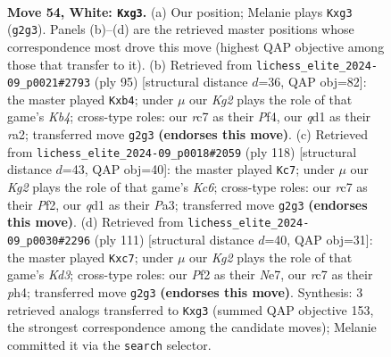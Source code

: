 \documentclass[11pt]{article}
\begin{document}
\clearpage

\begin{figure}[p]\centering
\begin{subfigure}{0.46\textwidth}\centering
\resizebox{\linewidth}{!}{%
\newchessgame
\chessboard[
  setfen={8/2r3pk/1P6/8/3pp3/6r1/5PK1/3q4 w - - 0 54},
  showmover=false,
  pgfstyle=straightmove, color=movearrow, markmove={g2-g3}
]}
\caption{}
\end{subfigure}\hfill
\begin{subfigure}{0.46\textwidth}\centering
\resizebox{\linewidth}{!}{%
\newchessgame
\chessboard[
  setfen={8/8/3p4/1kpP4/1R3p2/8/R5P1/2K5 b - - 0 48},
  showmover=false,
  pgfstyle=straightmove, color=movearrow, markmove={b5-b4}
]}
\caption{}
\end{subfigure}
\\[4pt]
\begin{subfigure}{0.46\textwidth}\centering
\resizebox{\linewidth}{!}{%
\newchessgame
\chessboard[
  setfen={7R/5k2/r1KP1p2/8/p6p/P7/5P2/8 w - - 7 60},
  showmover=false,
  pgfstyle=straightmove, color=movearrow, markmove={c6-c7}
]}
\caption{}
\end{subfigure}\hfill
\begin{subfigure}{0.46\textwidth}\centering
\resizebox{\linewidth}{!}{%
\newchessgame
\chessboard[
  setfen={8/2P1n3/3k2R1/7p/7P/6P1/6K1/8 b - - 0 56},
  showmover=false,
  pgfstyle=straightmove, color=movearrow, markmove={d6-c7}
]}
\caption{}
\end{subfigure}
\caption{\textbf{Move 54, White: \texttt{Kxg3}.} (a) Our position; Melanie plays \texttt{Kxg3} (\texttt{g2g3}). Panels (b)--(d) are the retrieved master positions whose correspondence most drove this move (highest QAP objective among those that transfer to it). (b) Retrieved from \texttt{lichess\_elite\_2024-09\_p0021\#2793} (ply 95) [structural distance $d$=36, QAP obj=82]: the master played \texttt{Kxb4}; under $\mu$ our \emph{Kg2} plays the role of that game's \emph{Kb4}; cross-type roles: our \emph{r}c7 as their \emph{P}f4, our \emph{q}d1 as their \emph{r}a2; transferred move \texttt{g2g3} \textbf{(endorses this move)}. (c) Retrieved from \texttt{lichess\_elite\_2024-09\_p0018\#2059} (ply 118) [structural distance $d$=43, QAP obj=40]: the master played \texttt{Kc7}; under $\mu$ our \emph{Kg2} plays the role of that game's \emph{Kc6}; cross-type roles: our \emph{r}c7 as their \emph{P}f2, our \emph{q}d1 as their \emph{P}a3; transferred move \texttt{g2g3} \textbf{(endorses this move)}. (d) Retrieved from \texttt{lichess\_elite\_2024-09\_p0030\#2296} (ply 111) [structural distance $d$=40, QAP obj=31]: the master played \texttt{Kxc7}; under $\mu$ our \emph{Kg2} plays the role of that game's \emph{Kd3}; cross-type roles: our \emph{P}f2 as their \emph{N}e7, our \emph{r}c7 as their \emph{p}h4; transferred move \texttt{g2g3} \textbf{(endorses this move)}. Synthesis: 3 retrieved analogs transferred to \texttt{Kxg3} (summed QAP objective 153, the strongest correspondence among the candidate moves); Melanie committed it via the \texttt{search} selector.}
\label{fig:thought-m106}
\end{figure}
\end{document}
